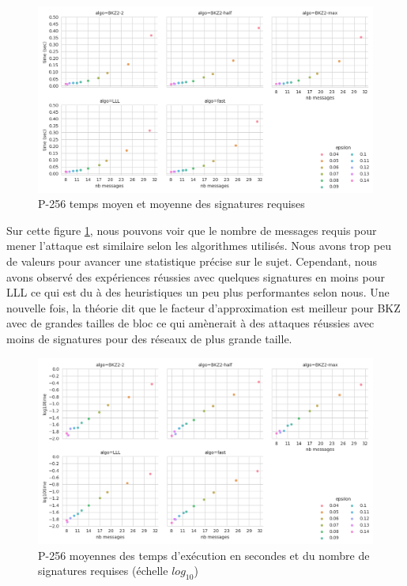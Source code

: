 \documentclass{backend}
\begin{document}
\newpage
\begin{figure}[ht]
    \centering
    \includegraphics[width=1\linewidth]{img/P-256_meant_meanm_scatterplots.png}
    \caption{P-256 temps moyen et moyenne des signatures requises}
    \label{fig:P-256_meant_meanm_scatterplots}
\end{figure}

Sur cette figure \ref{fig:P-256_meant_meanm_scatterplots}, nous pouvons voir que le nombre de messages requis pour mener l'attaque est similaire selon les algorithmes utilisés. Nous avons trop peu de valeurs pour avancer une statistique précise sur le sujet. Cependant, nous avons observé des expériences réussies avec quelques signatures en moins pour LLL ce qui est du à des heuristiques un peu plus performantes selon nous. Une nouvelle fois, la théorie dit que le facteur d'approximation est meilleur pour BKZ avec de grandes tailles de bloc ce qui amènerait à des attaques réussies avec moins de signatures pour des réseaux de plus grande taille.

\begin{figure}[H]
    \centering
    \includegraphics[width=1\linewidth]{img/P-256_meant_meanm_scatterplots_log.png}
    \caption{P-256 moyennes des temps d'exécution en secondes et du nombre de signatures requises (échelle $log_{10}$)}
    \label{fig:P-256_meant_meanm_scatterplots_log}
\end{figure}
\end{document}
